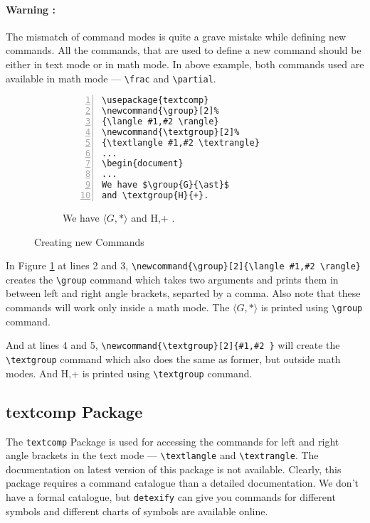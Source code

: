 \documentclass{article}
\theoremstyle{definition}
\theoremstyle{remark}
\newcommand{\group}[2]{\langle #1,#2 \rangle}
\newcommand{\textgroup}[2]{\textlangle #1,#2 \textrangle}
\begin{document}
\paragraph{Warning :}
The mismatch of command modes is quite a grave mistake while defining new commands. All the commands, that are used to define a new command should be either in text mode or in math mode. In above example, both commands used are available in math mode --- \texttt{\textbackslash frac} and \texttt{\textbackslash partial}.
	
\begin{figure}[h]
\centering
\begin{subfigure}{0.45\textwidth}
\begin{Verbatim}[numbers = left]
\usepackage{textcomp}
\newcommand{\group}[2]%
{\langle #1,#2 \rangle}
\newcommand{\textgroup}[2]%
{\textlangle #1,#2 \textrangle}
...
\begin{document}
...
We have $\group{G}{\ast}$
and \textgroup{H}{+}.
\end{Verbatim}
\end{subfigure}
\begin{subfigure}{0.45\textwidth}
\centering
We have $\group{G}{\ast}$ and \textgroup{H}{+}.
\end{subfigure} 
\caption{Creating new Commands}
\label{fig:cmd}
\end{figure}
	
	In Figure \ref{fig:cmd} at lines 2 and 3,  \texttt{\textbackslash newcommand\{\textbackslash group\}[2]\{\textbackslash langle \#1,\#2 \textbackslash rangle\}} creates the \texttt{\textbackslash group} command which takes two arguments and prints them in between left and right angle brackets, separted by a comma. Also note that these commands will work only inside a math mode. The $\group{G}{\ast}$ is printed using \texttt{\textbackslash group} command.
	
	And at lines 4 and 5, \texttt{\textbackslash newcommand\{\textbackslash textgroup\}[2]\{\textlangle \#1,\#2 \textrangle\}} will create the \texttt{\textbackslash textgroup} command which also does the same as former, but outside math modes. And \textgroup{H}{+} is printed using \texttt{\textbackslash textgroup} command.

\subsection{textcomp Package}
	The \texttt{textcomp} Package is used for accessing the commands for left and right angle brackets in the text mode --- \texttt{\textbackslash textlangle} and \texttt{\textbackslash textrangle}. The documentation on latest version of this package is not available. Clearly, this package requires a command catalogue than a detailed documentation. We don't have a formal catalogue, but \texttt{detexify} can give you commands for different symbols and different charts of symbols are available online.
\end{document}
